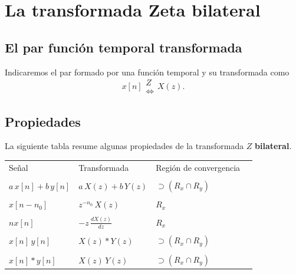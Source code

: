\section{La transformada Zeta bilateral}

\subsection{El par funci\'{o}n temporal transformada}

Indicaremos el par formado por una funci\'{o}n temporal y su transformada como 
\begin{equation}
x\left[ n\right] 
\begin{array}{c}
Z \\ 
\Leftrightarrow
\end{array}
X\left( z\right) .
\end{equation}

\subsection{Propiedades}

La siguiente tabla resume algunas propiedades de la transformada $Z$ \textbf{bilateral}.

\begin{center}
\begin{tabular}{llll}
Se\~{n}al                  & Transformada                                  & Regi\'{o}n de convergencia \\ 
&&\\
$a \, x\left[ n\right] +b \, y\left[ n\right] $ & 
$a \, X\left( z\right) +b \, Y\left( z\right) $ & 
     $\supset \left( R_{x}\cap R_{y}\right) $ \\ 
&&\\
$x\left[ n-n_{0}\right] $               & $z^{-n_{0}} \, X\left( z\right) $           & $R_{x}^{ }$ \\ 
&&\\
$nx\left[ n\right] $                    & $-z \, \frac{dX\left(z\right) }{dz}$        & $R_{x}^{ }$ \\ 
&&\\
$x\left[ n\right] \, y\left[ n\right]$    & $X\left( z\right) * Y\left( z\right) $  & 
     $\supset \left( R_{x}\cap R_{y}\right)$                                                    \\
&&\\
$x\left[ n\right] *  y\left[ n\right]$  & $X\left( z\right) \, Y\left( z\right) $   & 
     $\supset \left( R_{x}\cap R_{y}\right)$
\end{tabular}
\end{center}

